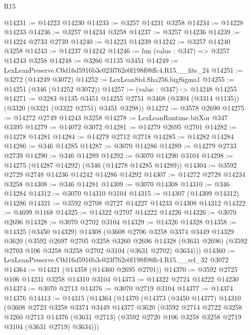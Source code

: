 \begin{lexlean}{R15}
\begin{coremodule}
@14231 := @14223 @14230
@14233 := @3257 @14231 @3258
@14234 := @14228 @14233
@14236 := @3257 @14234 @3258
@14237 := @3257 @14236
@14239 := @14224 @2733 @2739
@14240 := @14223 @14239
@14242 := @3257 @14240 @3258
@14243 := @14237 @14242
@14246 := fun (value : @347) => @3257 @14243 @3258
@14248 := @3266 @1135 @3451
@14249 := LexLeanPreserve.C0d16d5916b3c023f762e0f198f08ffc4.R15.__fits_24
@14251 := @3272 (@14249 @3072)
@14252 := LexLeanStd.Sha256.bigSigma1
@14255 := @14251 (@346 (@14252 @3072))
@14257 := (value : @347) -> @14248 @14255
@14271 := @3283
    @1135
    @3451
    @14255
    @2751
    @3468
    (@3304 (@3314 @1135))
    (@3320 (@3321 (@3322 @2751) @3451 @3298))
@14272 := @3578 @2690
@14275 := @14272 @2749 @14243 @3258
@14278 := LexLeanRuntime.bitXor @347 @3395
@14279 := @14072 @3072
@14281 := @14279 @2695 @2701
@14282 := @14278 @14281
@14284 := @14279 @2712 @2718
@14285 := @14282 @14284
@14286 := @346 @14285
@14287 := @3070 @14286
@14289 := @14279 @2733 @2739
@14290 := @346 @14289
@14292 := @3070 @14290 @3104
@14298 := @14275 (@14287 @14292) (@346 (@14278 @14285 @14289))
@14304 := @3592 @2729 @2748 @14236 @14242 @14286 @14292
@14307 := @14272 @2728 @14234 @3258
@14308 := @346 @14281
@14309 := @3070 @14308
@14310 := @346 @14284
@14312 := @3070 @14310 @3104
@14315 := @14307 (@14309 @14312) @14286
@14321 := @3592 @2708 @2727 @14227 @14233 @14308 @14312
@14322 := @4699 @1168
@14325 := @14322 @2707 @14222 @14226
@14326 := @3070 @2696
@14328 := @3070 @2702 @3104
@14329 := @14326 @14328
@14358 := @14325
    (@3450 @14329)
    @14308
    (@3608
      @2706
      @3258
      @3374
      @3449
      @14329
      @3620
      (@3592
        @2697
        @2705
        @3258
        @3260
        @2696
        @14328
        (@3631 @2696)
        (@3592 @2703 @106 @3258 @3258 @2702 @3104 (@3631 @2702) @3634)))
@14360 := LexLeanPreserve.C0d16d5916b3c023f762e0f198f08ffc4.R15.__rel_32 @3072
@14364 := @14321 (@14358 (@14360 @2695 @2701))
@14370 := @3592 @2725 @106 @14231 @3258 @14310 @3104
@14373 := @14322 @2724 @14222 @14230
@14374 := @3070 @2713
@14376 := @3070 @2719 @3104
@14377 := @14374 @14376
@14413 := @14315
    (@14364
      (@14370
        (@14373
          (@3450 @14377)
          @14310
          (@3608
            @2723
            @3258
            @3374
            @3449
            @14377
            @3620
            (@3592
              @2714
              @2722
              @3258
              @3260
              @2713
              @14376
              (@3631 @2713)
              (@3592 @2720 @106 @3258 @3258 @2719 @3104 (@3631 @2719) @3634)))

\end{coremodule}
\end{lexlean}
